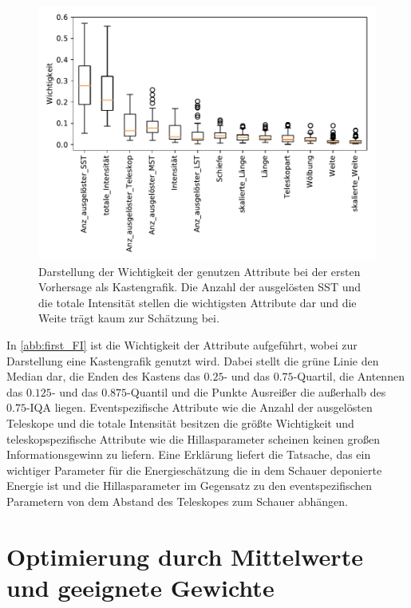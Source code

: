\begin{figure}
  \includegraphics[width=\textwidth]{Plots/feautureimportance_boxplot_firstForest.pdf}
  \centering
  \caption{Darstellung der Wichtigkeit der genutzen Attribute bei der ersten Vorhersage als Kastengrafik. Die Anzahl der ausgelösten SST und die totale Intensität
          stellen die wichtigsten Attribute dar und die Weite trägt kaum zur Schätzung bei.}
  \label{abb:first_FI}
\end{figure}

In \autoref{abb:first_FI} ist die Wichtigkeit der Attribute aufgeführt, wobei zur Darstellung eine Kastengrafik genutzt wird.
Dabei stellt die grüne Linie den Median dar, die Enden des Kastens das $\num{0.25}$- und das $\num{0.75}$-Quartil, die Antennen das $\num{0.125}$- und das
$\num{0.875}$-Quantil und die Punkte Ausreißer die außerhalb des $\num{0.75}$-IQA liegen.
Eventspezifische Attribute wie die Anzahl der ausgelösten Teleskope und die totale Intensität besitzen die größte Wichtigkeit und teleskopspezifische Attribute
wie die Hillasparameter scheinen keinen großen Informationsgewinn zu liefern.
Eine Erklärung liefert die Tatsache, das ein wichtiger Parameter für die Energieschätzung die in dem Schauer deponierte Energie ist und die Hillasparameter im
Gegensatz zu den eventspezifischen Parametern von dem Abstand des Teleskopes zum Schauer abhängen.

\section{Optimierung durch Mittelwerte und geeignete Gewichte}

